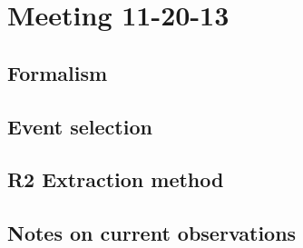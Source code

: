 \documentclass{article}
\begin{document}
\tableofcontents

\section{Meeting 11-20-13}
\subsection{Formalism}
\subsection{Event selection}
\subsection{R2 Extraction method}
\subsection{Notes on current observations}






\end{document}
